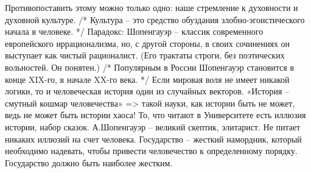 \documentclass[12pt]{article}
\begin{document}
Противопоставить этому можно только одно: наше стремление к духовности и духовной культуре. 
/* Культура – это средство обуздания злобно-эгоистического начала в человеке. */
Парадокс: Шопенгауэр – классик современного европейского иррационализма, но, с другой стороны, в своих
сочинениях он выступает как чистый рационалист. (Его трактаты строги, без поэтических вольностей. Он
понятен.) /* Популярным в России Шопенгауэр становится в конце XIX-го, в начале XX-го века. */
Если мировая воля не имеет никакой логики, то и человеческая история один из случайных векторов. «История
– смутный кошмар человечества» => такой науки, как истории быть не может, ведь не может быть истории
хаоса! То, что читают в Университете есть иллюзия истории, набор сказок.
А.Шопенгауэр – великий скептик, элитарист. Не питает никаких иллюзий на счет человека. Государство –
жесткий намордник, который необходимо надевать, чтобы привести человечество к определенному порядку.
Государство должно быть наиболее жестким.

\newpage
\end{document}
